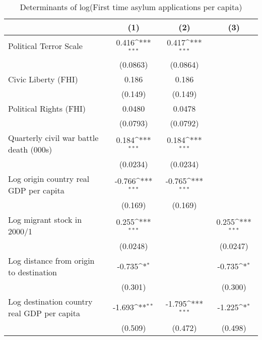 \begin{table}[htbp]\centering
\def\sym#1{\ifmmode^{#1}\else\(^{#1}\)\fi}
\caption{Determinants of log(First time asylum applications per capita)}
\begin{tabular}{l*{3}{c}}
\hline\hline
                    &\multicolumn{1}{c}{(1)}         &\multicolumn{1}{c}{(2)}         &\multicolumn{1}{c}{(3)}         \\
\hline
Political Terror Scale&       0.416\sym{***}&       0.417\sym{***}&                     \\
                    &    (0.0863)         &    (0.0864)         &                     \\
[1em]
Civic Liberty (FHI) &       0.186         &       0.186         &                     \\
                    &     (0.149)         &     (0.149)         &                     \\
[1em]
Political Rights (FHI)&      0.0480         &      0.0478         &                     \\
                    &    (0.0793)         &    (0.0792)         &                     \\
[1em]
Quarterly civil war battle death (000s)&       0.184\sym{***}&       0.184\sym{***}&                     \\
                    &    (0.0234)         &    (0.0234)         &                     \\
[1em]
Log origin country real GDP per capita&      -0.766\sym{***}&      -0.765\sym{***}&                     \\
                    &     (0.169)         &     (0.169)         &                     \\
[1em]
Log migrant stock in 2000/1&       0.255\sym{***}&                     &       0.255\sym{***}\\
                    &    (0.0248)         &                     &    (0.0247)         \\
[1em]
Log distance from origin to destination&      -0.735\sym{*}  &                     &      -0.735\sym{*}  \\
                    &     (0.301)         &                     &     (0.300)         \\
[1em]
Log destination country real GDP per capita&      -1.693\sym{**} &      -1.795\sym{***}&      -1.225\sym{*}  \\
                    &     (0.509)         &     (0.472)         &     (0.498)         \\

\end{tabular}
\end{table}
